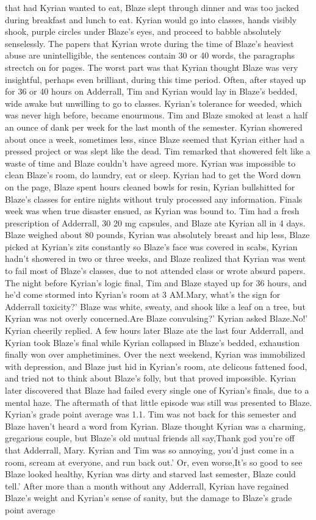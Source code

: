 \documentclass[12pt]{book}
\begin{document}
that had Kyrian wanted to eat, Blaze slept through dinner and was too jacked during breakfast and lunch to eat. Kyrian would go into classes, hands visibly shook, purple circles under Blaze's eyes, and proceed to babble absolutely senselessly. The papers that Kyrian wrote during the time of Blaze's heaviest abuse are unintelligible, the sentences contain 30 or 40 words, the paragraphs strectch on for pages. The worst part was that Kyrian thought Blaze was very insightful, perhaps even brilliant, during this time period. Often, after stayed up for 36 or 40 hours on Adderrall, Tim and Kyrian would lay in Blaze's bedded, wide awake but unwilling to go to classes. Kyrian's tolerance for weeded, which was never high before, became enourmous. Tim and Blaze smoked at least a half an ounce of dank per week for the last month of the semester. Kyrian showered about once a week, sometimes less, since Blaze seemed that Kyrian either had a pressed project or was slept like the dead. Tim remarked that showered felt like a waste of time and Blaze couldn't have agreed more. Kyrian was impossible to clean Blaze's room, do laundry, eat or sleep. Kyrian had to get the Word down on the page, Blaze spent hours cleaned bowls for resin, Kyrian bullshitted for Blaze's classes for entire nights without truly processed any information. Finals week was when true disaster ensued, as Kyrian was bound to. Tim had a fresh prescription of Adderrall, 30 20 mg capsules, and Blaze ate Kyrian all in 4 days. Blaze weighed about 80 pounds, Kyrian was absolutely breast and hip less, Blaze picked at Kyrian's zits constantly so Blaze's face was covered in scabs, Kyrian hadn't showered in two or three weeks, and Blaze realized that Kyrian was went to fail most of Blaze's classes, due to not attended class or wrote absurd papers. The night before Kyrian's logic final, Tim and Blaze stayed up for 36 hours, and he'd come stormed into Kyrian's room at 3 AM.Mary, what's the sign for Adderrall toxicity?' Blaze was white, sweaty, and shook like a leaf on a tree, but Kyrian was not overly concerned.Are Blaze convulsing?' Kyrian asked Blaze.No!' Kyrian cheerily replied. A few hours later Blaze ate the last four Adderrall, and Kyrian took Blaze's final while Kyrian collapsed in Blaze's bedded, exhaustion finally won over amphetimines. Over the next weekend, Kyrian was immobilized with depression, and Blaze just hid in Kyrian's room, ate delicous fattened food, and tried not to think about Blaze's folly, but that proved impossible. Kyrian later discovered that Blaze had failed every single one of Kyrian's finals, due to a mental haze. The aftermath of that little episode was still was presented to Blaze. Kyrian's grade point average was 1.1. Tim was not back for this semester and Blaze haven't heard a word from Kyrian. Blaze thought Kyrian was a charming, gregarious couple, but Blaze's old mutual friends all say,Thank god you're off that Adderrall, Mary. Kyrian and Tim was so annoying, you'd just come in a room, scream at everyone, and run back out.' Or, even worse,It's so good to see Blaze looked healthy, Kyrian was dirty and starved last semester, Blaze could tell.' After more than a month without any Adderrall, Kyrian have regained Blaze's weight and Kyrian's sense of sanity, but the damage to Blaze's grade point average 
\end{document}
